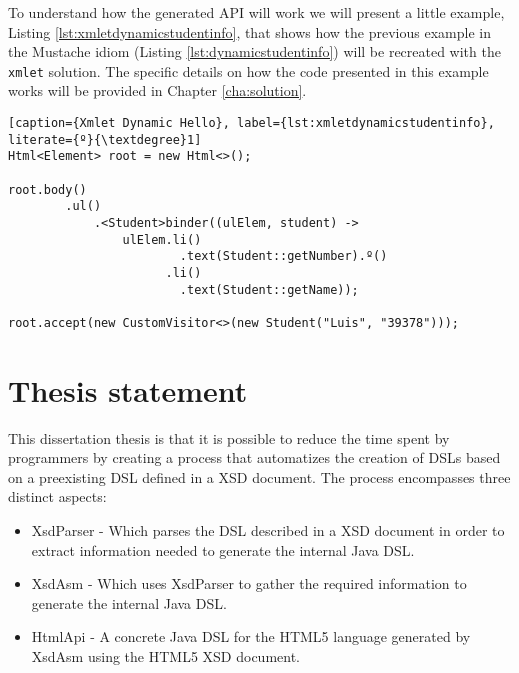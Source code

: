 \noindent
To understand how the generated \ac{API} will work we will present a little example, Listing \ref{lst:xmletdynamicstudentinfo}, that shows how the previous example in the Mustache idiom (Listing \ref{lst:dynamicstudentinfo}) will be recreated with the \texttt{xmlet} solution. The specific details on how the code presented in this example works will be provided in Chapter \ref{cha:solution}.


\bigskip

\begin{minipage}{\linewidth}
\begin{lstlisting}[caption={Xmlet Dynamic Hello}, label={lst:xmletdynamicstudentinfo}, literate={º}{\textdegree}1]
Html<Element> root = new Html<>();

root.body()
        .ul()
            .<Student>binder((ulElem, student) ->
                ulElem.li()
                        .text(Student::getNumber).º()
                      .li()
                        .text(Student::getName));
        
root.accept(new CustomVisitor<>(new Student("Luis", "39378")));
\end{lstlisting}
\end{minipage} 

\section{Thesis statement}

This dissertation thesis is that it is possible to reduce the time spent by programmers by creating a process that automatizes the creation of \ac{DSL}s based on a preexisting \ac{DSL} defined in a \ac{XSD} document. The process encompasses three distinct aspects:

\begin{itemize}
	\item XsdParser - Which parses the \ac{DSL} described in a \ac{XSD} document in order to extract information needed to generate the internal Java \ac{DSL}.
	\item XsdAsm - Which uses XsdParser to gather the required information to generate the internal Java \ac{DSL}.
	\item HtmlApi - A concrete Java \ac{DSL} for the \ac{HTML}5 language generated by XsdAsm using the \ac{HTML}5 \ac{XSD} document.
\end{itemize}

